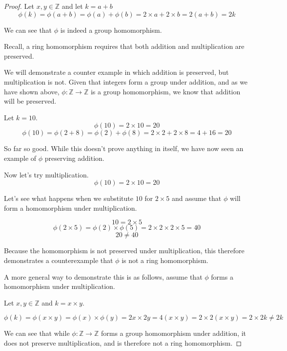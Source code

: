 \documentclass[a4paper]{article}
\begin{document}
\begin{myparindent}{0pt}
\begin{proof}
  Let $x, y \in \mathbb{Z}$ and let $k = a + b$
  \[ \phi(k) = \phi(a + b) = \phi(a) + \phi(b) = 2 \times a + 2 \times b =
  2(a + b) = 2k
  \]

  We can see that $\phi$ is indeed a group homomorphism. \newline

  Recall, a ring homomorphism requires that both addition and multiplication
  are preserved. \newline

  We will demonstrate a counter example in which addition is preserved, but
  multiplication is not. Given that integers form a group under addition,
  and as we have shown above, $\phi: \mathbb{Z} \rightarrow \mathbb{Z}$ is a
  group homomorphism, we know that addition will be preserved. \newline

  Let $k = 10$.
  \[ \phi(10) = 2 \times 10 = 20 \]
  \[ \phi(10) = \phi(2 + 8) = \phi(2) + \phi(8) = 2 \times 2 + 2 \times 8 = 4 + 16 = 20 \]

  So far so good. While this doesn't prove anything in itself, we have now seen an
  example of $\phi$ preserving addition. \newline

  Now let's try multiplication.
  \[ \phi(10) = 2 \times 10 = 20 \]

  Let's see what happens when we substitute $10$ for $2 \times 5$ and assume that
  $\phi$ will form a homomorphism under multiplication.

  \[ 10 = 2 \times 5 \]
  \[ \phi(2 \times 5) = \phi(2) \times \phi(5) = 2 \times 2 \times 2 \times 5 = 40 \]
  \[ 20 \neq 40 \]

  Because the homomorphism is not preserved under multiplication, this therefore
  demonstrates a counterexample that $\phi$ is not a ring homomorphism.

  A more general way to demonstrate this is as follows, assume that $\phi$
  forms a homomorphism under multiplication. \newline

  Let $x, y \in \mathbb{Z}$ and $k = x \times y$.

  \[ \phi(k) = \phi(x \times y) = \phi(x) \times \phi(y) = 2x \times 2y = 4(x \times y) =
  2 \times 2(x \times y) = 2 \times 2k \neq 2k \]

  We can see that while $\phi: \mathbb{Z} \rightarrow \mathbb{Z}$ forms a group
  homomorphism under addition, it does not preserve multiplication, and is
  therefore not a ring homomorphism.

\end{proof}

\end{myparindent}
\end{document}
